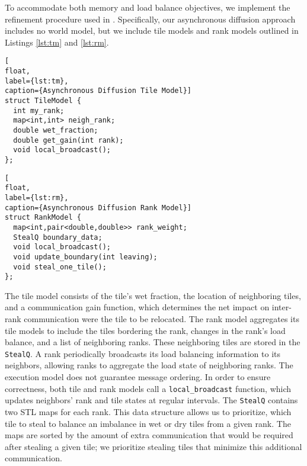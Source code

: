 To accommodate both memory and load balance objectives, we implement the refinement procedure used in \cite{Karypis1998b}.
Specifically, our asynchronous diffusion approach includes no world model, but we include tile models and rank models outlined in Listings \ref{lst:tm} and \ref{lst:rm}.


\begin{lstlisting}[
float,
label={lst:tm},
caption={Asynchronous Diffusion Tile Model}]
struct TileModel {
  int my_rank;
  map<int,int> neigh_rank;
  double wet_fraction;  
  double get_gain(int rank);
  void local_broadcast();
};
\end{lstlisting}

\begin{lstlisting}[
float,
label={lst:rm},
caption={Asynchronous Diffusion Rank Model}]
struct RankModel {
  map<int,pair<double,double>> rank_weight;
  StealQ boundary_data;
  void local_broadcast();
  void update_boundary(int leaving);
  void steal_one_tile();
};
\end{lstlisting}

The tile model consists of the tile's wet fraction, the location of neighboring tiles, and a communication gain function, which determines the net impact on inter-rank communication were the tile to be relocated.
The rank model aggregates its tile models to include the tiles bordering the rank, changes in the rank's load balance, and a list of neighboring ranks. These neighboring tiles are stored in the \texttt{StealQ}.
A rank periodically broadcasts its load balancing information to its neighbors,
allowing ranks to aggregate the load state of neighboring ranks.
The execution model does not guarantee message ordering. In order to ensure correctness, both tile and rank models call a \texttt{local\_broadcast} function, which updates neighbors' rank and tile states at regular intervals.
The \texttt{StealQ} contains two STL maps for each rank. This data structure allows us to prioritize, which tile to steal to balance an imbalance in wet or dry tiles from a given rank. The maps are sorted by the amount of extra communication that would be required after stealing a given tile; we prioritize stealing tiles that minimize this additional communication.

